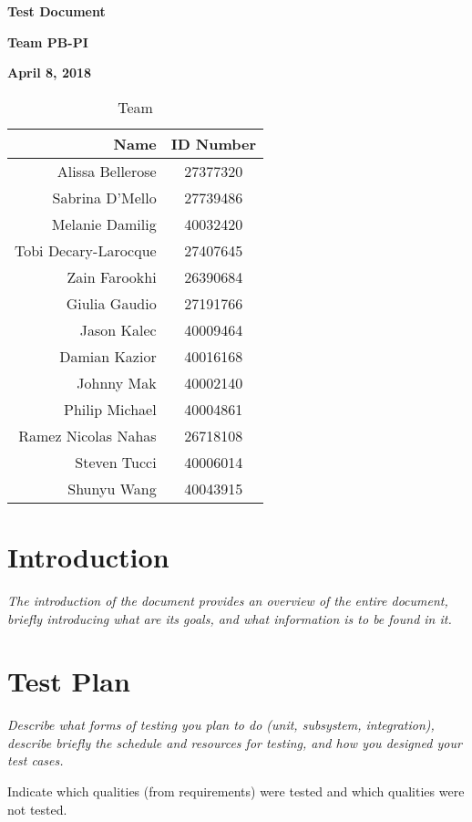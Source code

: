 \documentclass[12pt]{article}
\begin{document}
\vspace*{0.5in}
\centerline{\bf\Large Test Document}

\vspace*{0.5in}
\centerline{\bf\Large Team PB-PI}

\vspace*{0.5in}
\centerline{\bf\Large April 8, 2018}

\vspace*{1.5in}
\begin{table}[htbp]
\caption{Team}
\begin{center}
\begin{tabular}{|r | c|}
\hline
Name & ID Number \\
\hline\hline
Alissa Bellerose & 27377320 \\
Sabrina D'Mello & 27739486 \\
Melanie Damilig & 40032420 \\
Tobi Decary-Larocque & 27407645 \\
Zain Farookhi & 26390684 \\
Giulia Gaudio & 27191766 \\
Jason Kalec & 40009464 \\
Damian Kazior & 40016168 \\
Johnny Mak & 40002140 \\
Philip Michael & 40004861 \\
Ramez Nicolas Nahas & 26718108 \\
Steven Tucci & 40006014 \\
Shunyu Wang & 40043915 \\
\hline
\end{tabular}
\end{center}
\end{table}

\clearpage

\section{Introduction}

{\it
The introduction of the document provides an overview of the entire document,
briefly introducing what are its goals, and what information is to be found in it.
}

\section{Test Plan}

{\it
Describe what forms of testing you plan to do (unit, subsystem, integration),
describe briefly the schedule and resources for testing,
and
how you designed your test cases.

Indicate which qualities (from requirements) were tested and which qualities were not tested.
}
\end{document}
